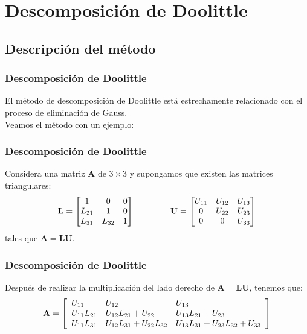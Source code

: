 \documentclass[12pt]{beamer}
\begin{document}
\section{Descomposición de Doolittle}
\subsection{Descripción del método}

\begin{frame}
\frametitle{Descomposición de Doolittle}
El método de descomposición de Doolittle está estrechamente relacionado con el proceso de eliminación de Gauss.
\\
\bigskip
\pause
Veamos el método con un ejemplo:
\end{frame}
\begin{frame}[fragile]
\frametitle{Descomposición de Doolittle}
Considera una matriz $\mathbf{A}$ de $3 \times 3$ y supongamos que existen las matrices triangulares:
\pause
\begin{align*}
\mathbf{L} =
\begin{bmatrix}
1 & 0 & 0 \\
L_{21} & 1 & 0 \\
L_{31} & L_{32} & 1
\end{bmatrix}
\hspace{1.5cm} \mathbf{U} =
\begin{bmatrix}
U_{11} & U_{12} & U_{13} \\
0 & U_{22} & U_{23} \\
0 & 0 & U_{33}
\end{bmatrix}
\end{align*}
tales que $\mathbf{A = LU}$.
\end{frame}
\begin{frame}
\frametitle{Descomposición de Doolittle}
Después de realizar la multiplicación del lado derecho de $\mathbf{A = LU}$, tenemos que:
\pause
\fontsize{12}{12}\selectfont
\begin{align*}
\mathbf{A} = \begin{bmatrix}
\begin{array}{l l l}
U_{11} & U_{12} & U_{13} \\
U_{11}L_{21} & U_{12}L_{21} + U_{22} & U_{13}L_{21} + U_{23} \\
U_{11}L_{31} & U_{12}L_{31} + U_{22}L_{32} & U_{13}L_{31} + U_{23}L_{32} + U_{33}
\end{array}
\end{bmatrix}
\end{align*}
\end{frame}
\end{document}
